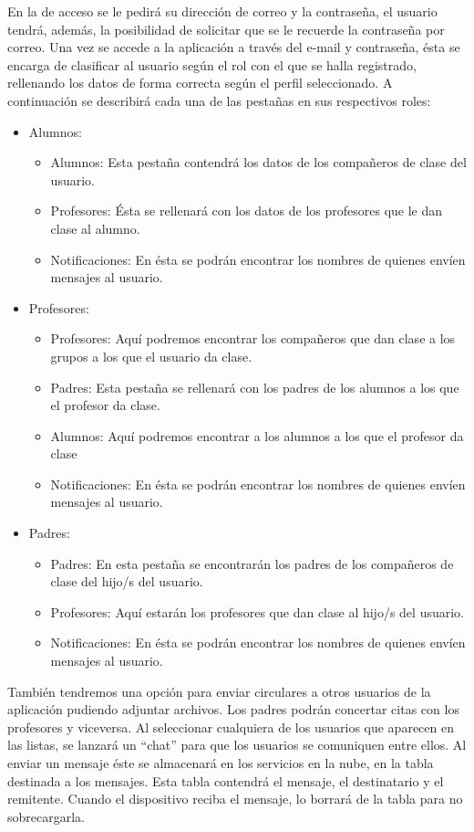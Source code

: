 	En la de acceso se le pedirá su dirección de correo y la contraseña, el usuario tendrá, además, la posibilidad de solicitar que se le recuerde la contraseña por correo.
	\bigskip
	Una vez se accede a la aplicación a través del e-mail y contraseña, ésta se encarga de clasificar al usuario según el rol con el que se halla registrado, rellenando los datos de forma correcta según el perfil seleccionado. A continuación se describirá cada una de las pestañas en sus respectivos roles:
	\bigskip
	\begin{itemize}
		\item Alumnos:
			\begin{itemize}
				\item Alumnos: Esta pestaña contendrá los datos de los compañeros de clase del usuario.
				\item Profesores: Ésta se rellenará con los datos de los profesores que le dan clase al alumno.
				\item Notificaciones: En ésta se podrán encontrar los nombres de quienes envíen mensajes al usuario.
			\end{itemize}
		\item Profesores:
			\begin{itemize}
				\item Profesores: Aquí podremos encontrar los compañeros que dan clase a los grupos a los que el usuario da clase.
				\item Padres: Esta pestaña se rellenará con los padres de los alumnos a los que el profesor da clase.
				\item Alumnos: Aquí podremos encontrar a los alumnos a los que el profesor da clase
				\item Notificaciones: En ésta se podrán encontrar los nombres de quienes envíen mensajes al usuario.
			\end{itemize}
		\item Padres:
			\begin{itemize}
				\item Padres: En esta pestaña se encontrarán los padres de los compañeros de clase del hijo/s del usuario.
				\item Profesores: Aquí estarán los profesores que dan clase al hijo/s del usuario.
				\item Notificaciones: En ésta se podrán encontrar los nombres de quienes envíen mensajes al usuario.
			\end{itemize}
	\end{itemize}
									
	También tendremos una opción para enviar circulares a otros usuarios de la aplicación pudiendo adjuntar archivos. Los padres podrán concertar citas con los profesores y viceversa.
	Al seleccionar cualquiera de los usuarios que aparecen en las listas, se lanzará un ``chat'' para que los usuarios se comuniquen entre ellos. Al enviar un mensaje éste se almacenará en los servicios en la nube, en la tabla destinada a los mensajes. Esta tabla contendrá el mensaje, el destinatario y el remitente. Cuando el dispositivo reciba el mensaje, lo borrará de la tabla para no sobrecargarla.
	
